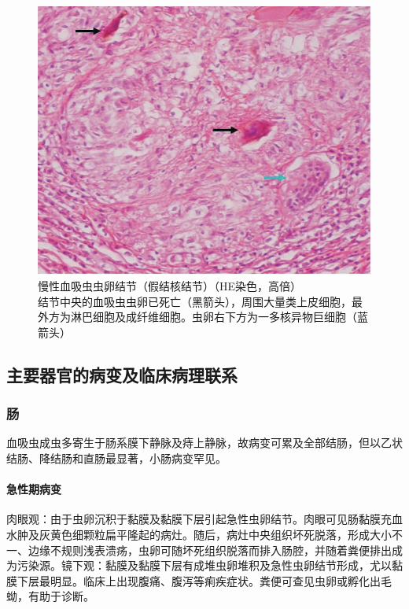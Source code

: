 \begin{figure}[!htbp]
 \centering
 \includegraphics{./images/Image00249.jpg}
 \captionsetup{justification=centering}
 \caption{慢性血吸虫虫卵结节（假结核结节）（HE染色，高倍）\\ {\small 结节中央的血吸虫虫卵已死亡（黑箭头），周围大量类上皮细胞，最外方为淋巴细胞及成纤维细胞。虫卵右下方为一多核异物巨细胞（蓝箭头）}}
\label{fig15-5}
  \end{figure}


\subsection{主要器官的病变及临床病理联系}

\subsubsection{肠}

血吸虫成虫多寄生于肠系膜下静脉及痔上静脉，故病变可累及全部结肠，但以乙状结肠、降结肠和直肠最显著，小肠病变罕见。

\paragraph{急性期病变}
肉眼观：由于虫卵沉积于黏膜及黏膜下层引起急性虫卵结节。肉眼可见肠黏膜充血水肿及灰黄色细颗粒扁平隆起的病灶。随后，病灶中央组织坏死脱落，形成大小不一、边缘不规则浅表溃疡，虫卵可随坏死组织脱落而排入肠腔，并随着粪便排出成为污染源。镜下观：黏膜及黏膜下层有成堆虫卵堆积及急性虫卵结节形成，尤以黏膜下层最明显。临床上出现腹痛、腹泻等痢疾症状。粪便可查见虫卵或孵化出毛蚴，有助于诊断。

